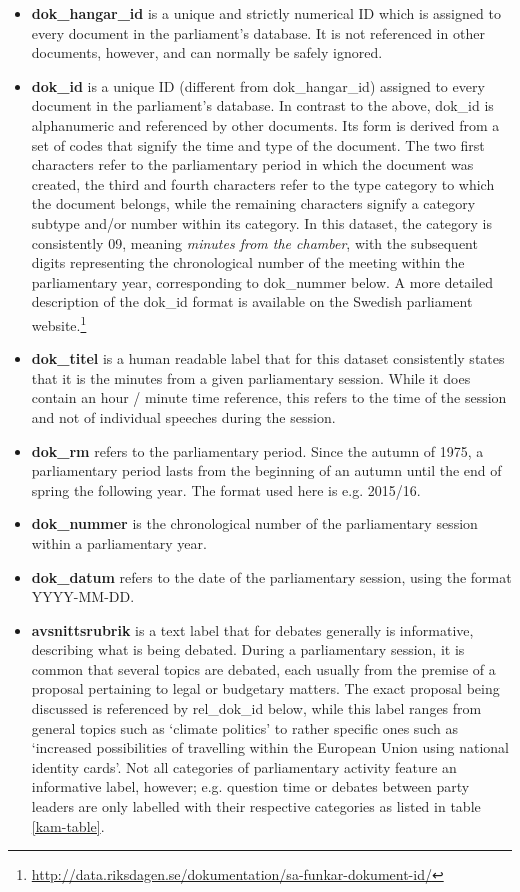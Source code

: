 \begin{itemize}
    \item \textbf{dok\_hangar\_id} is a unique and strictly numerical ID which is assigned to every document in the parliament's database. It is not referenced in other documents, however, and can normally be safely ignored.
    \item \textbf{dok\_id} is a unique ID (different from dok\_hangar\_id) assigned to every document in the parliament's database. In contrast to the above, dok\_id is alphanumeric and referenced by other documents. Its form is derived from a set of codes that signify the time and type of the document. The two first characters refer to the parliamentary period in which the document was created, the third and fourth characters refer to the type category to which the document belongs, while the remaining characters signify a category subtype and/or number within its category. In this dataset, the category is consistently 09, meaning \emph{minutes from the chamber}, with the subsequent digits representing the chronological number of the meeting within the parliamentary year, corresponding to dok\_nummer below.
    A more detailed description of the dok\_id format is available on the Swedish parliament website.\footnote{\url{http://data.riksdagen.se/dokumentation/sa-funkar-dokument-id/}}
    \item \textbf{dok\_titel} is a human readable label that for this dataset consistently states that it is the minutes from a given parliamentary session. While it does contain an hour / minute time reference, this refers to the time of the session and not of individual speeches during the session.
    \item \textbf{dok\_rm} refers to the parliamentary period. Since the autumn of 1975, a parliamentary period lasts from the beginning of an autumn until the end of spring the following year. The format used here is e.g. 2015/16.
    \item \textbf{dok\_nummer} is the chronological number of the parliamentary session within a parliamentary year. %
    \item \textbf{dok\_datum} refers to the date of the parliamentary session, using the format YYYY-MM-DD.
    \item \textbf{avsnittsrubrik} is a text label that for debates generally is informative, describing what is being debated. During a parliamentary session, it is common that several topics are debated, each usually from the premise of a proposal pertaining to legal or budgetary matters. The exact proposal being discussed is referenced by rel\_dok\_id below, while this label ranges from general topics such as `climate politics' to rather specific ones such as `increased possibilities of travelling within the European Union using national identity cards'. Not all categories of parliamentary activity feature an informative label, however; e.g. question time or debates between party leaders are only labelled with their respective categories as listed in table \ref{kam-table}.

\end{itemize}
